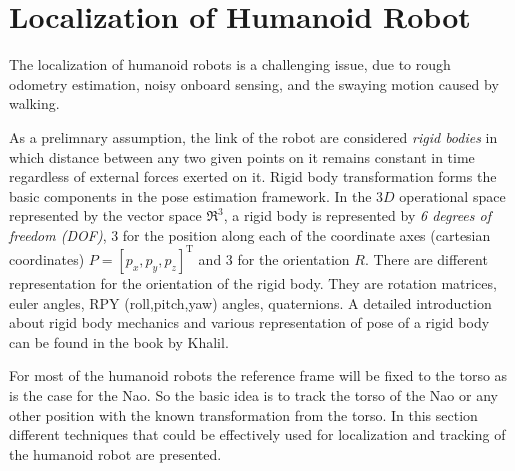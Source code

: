 
\chapter{Localization of Humanoid Robot} %

\label{Chapter4} %

		The localization of humanoid robots is a challenging issue, due to rough odometry estimation, noisy onboard sensing, and the swaying motion caused by walking\cite{Cervera2012}. 
		 
		As a prelimnary assumption, the link of the robot are considered \emph{rigid bodies} in which distance between any two given points on it remains constant in time regardless of external forces exerted on it. Rigid body transformation forms the basic components in the pose estimation framework. In the $3D$ operational space represented by the vector space $\Re^3$, a rigid body is represented by \emph{6 degrees of freedom (DOF)}, 3 for the position along each of the coordinate axes (cartesian coordinates) $P = [p_x,p_y,p_z]^{\text{T}}$ and 3 for the orientation $R$. There are different representation for the orientation of the rigid body. They are rotation matrices, euler angles, RPY (roll,pitch,yaw) angles, quaternions. A detailed introduction about rigid body mechanics and various representation of pose of a rigid body can be found in the book by Khalil\cite{Khalil2002}.
		
		For most of the humanoid robots the reference frame will be fixed to the torso as is the case for the Nao. So the basic idea is to track the torso of the Nao or any other position with the known transformation from the torso. In this section different techniques that could be effectively used for localization and tracking of the humanoid robot are presented.
